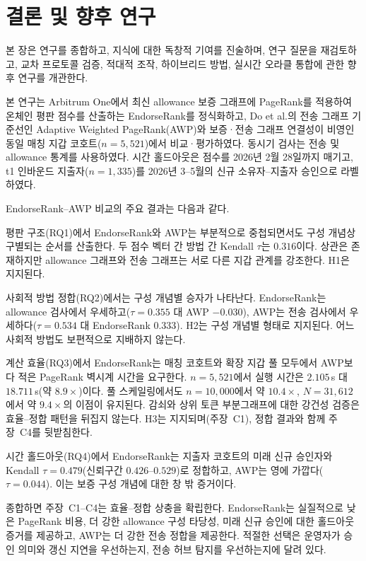 ﻿%
\chapter{결론 및 향후 연구}
\label{ch:conclusion}

본 장은 연구를 종합하고, 지식에 대한 독창적 기여를 진술하며, 연구 질문을 재검토하고, 교차 프로토콜 검증, 적대적 조작, 하이브리드 방법, 실시간 오라클 통합에 관한 향후 연구를 개관한다.


본 연구는 Arbitrum One에서 최신 allowance 보증 그래프에 PageRank를 적용하여 온체인 평판 점수를 산출하는 EndorseRank를 정식화하고, Do et al.의 전송 그래프 기준선인 Adaptive Weighted PageRank(AWP)와 보증·전송 그래프 연결성이 비영인 동일 매칭 지갑 코호트($n=5{,}521$)에서 비교·평가하였다. 동시기 검사는 전송 및 allowance 통계를 사용하였다. 시간 홀드아웃은 점수를 2026년 2월 28일까지 매기고, t1 인바운드 지출자($n=1{,}335$)를 2026년 3--5월의 신규 소유자--지출자 승인으로 라벨하였다.

EndorseRank--AWP 비교의 주요 결과는 다음과 같다.

평판 구조(RQ1)에서 EndorseRank와 AWP는 부분적으로 중첩되면서도 구성 개념상 구별되는 순서를 산출한다. 두 점수 벡터 간 방법 간 Kendall $\tau$는 $0.316$이다. 상관은 존재하지만 allowance 그래프와 전송 그래프는 서로 다른 지갑 관계를 강조한다. H1은 지지된다.

사회적 방법 정합(RQ2)에서는 구성 개념별 승자가 나타난다. EndorseRank는 allowance 검사에서 우세하고($\tau=0.355$ 대 AWP $-0.030$), AWP는 전송 검사에서 우세하다($\tau=0.534$ 대 EndorseRank $0.333$). H2는 구성 개념별 형태로 지지된다. 어느 사회적 방법도 보편적으로 지배하지 않는다.

계산 효율(RQ3)에서 EndorseRank는 매칭 코호트와 확장 지갑 풀 모두에서 AWP보다 적은 PageRank 벽시계 시간을 요구한다. $n=5{,}521$에서 실행 시간은 $2.105$\,s 대 $18.711$\,s(약 $8.9\times$)이다. 풀 스케일링에서도 $n=10{,}000$에서 약 $10.4\times$, $N=31{,}612$에서 약 $9.4\times$의 이점이 유지된다. 감쇠와 상위 토큰 부분그래프에 대한 강건성 검증은 효율--정합 패턴을 뒤집지 않는다. H3는 지지되며(주장~C1), 정합 결과와 함께 주장~C4를 뒷받침한다.

시간 홀드아웃(RQ4)에서 EndorseRank는 지출자 코호트의 미래 신규 승인자와 Kendall $\tau=0.479$(신뢰구간 $0.426$--$0.529$)로 정합하고, AWP는 영에 가깝다($\tau=0.044$). 이는 보증 구성 개념에 대한 창 밖 증거이다.

종합하면 주장~C1--C4는 효율--정합 상충을 확립한다. EndorseRank는 실질적으로 낮은 PageRank 비용, 더 강한 allowance 구성 타당성, 미래 신규 승인에 대한 홀드아웃 증거를 제공하고, AWP는 더 강한 전송 정합을 제공한다. 적절한 선택은 운영자가 승인 의미와 갱신 지연을 우선하는지, 전송 허브 탐지를 우선하는지에 달려 있다.

